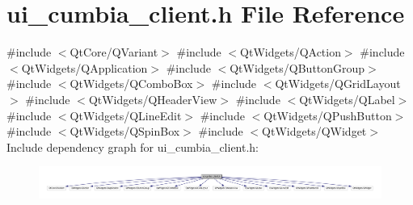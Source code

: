 \section{ui\+\_\+cumbia\+\_\+client.\+h File Reference}
\label{ui__cumbia__client_8h}
{\ttfamily \#include $<$Qt\+Core/\+Q\+Variant$>$}\newline
{\ttfamily \#include $<$Qt\+Widgets/\+Q\+Action$>$}\newline
{\ttfamily \#include $<$Qt\+Widgets/\+Q\+Application$>$}\newline
{\ttfamily \#include $<$Qt\+Widgets/\+Q\+Button\+Group$>$}\newline
{\ttfamily \#include $<$Qt\+Widgets/\+Q\+Combo\+Box$>$}\newline
{\ttfamily \#include $<$Qt\+Widgets/\+Q\+Grid\+Layout$>$}\newline
{\ttfamily \#include $<$Qt\+Widgets/\+Q\+Header\+View$>$}\newline
{\ttfamily \#include $<$Qt\+Widgets/\+Q\+Label$>$}\newline
{\ttfamily \#include $<$Qt\+Widgets/\+Q\+Line\+Edit$>$}\newline
{\ttfamily \#include $<$Qt\+Widgets/\+Q\+Push\+Button$>$}\newline
{\ttfamily \#include $<$Qt\+Widgets/\+Q\+Spin\+Box$>$}\newline
{\ttfamily \#include $<$Qt\+Widgets/\+Q\+Widget$>$}\newline
Include dependency graph for ui\+\_\+cumbia\+\_\+client.\+h\+:\nopagebreak
\begin{figure}[H]
\begin{center}
\leavevmode
\includegraphics[width=350pt]{ui__cumbia__client_8h__incl}
\end{center}
\end{figure}
